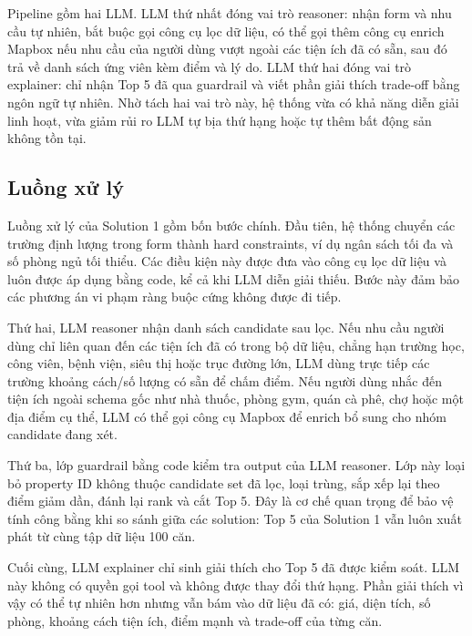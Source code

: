 \documentclass[a4paper,12pt]{article}
\begin{document}
Pipeline gồm hai LLM. LLM thứ nhất đóng vai trò reasoner: nhận form và nhu cầu tự nhiên, bắt buộc gọi công cụ lọc dữ liệu, có thể gọi thêm công cụ enrich Mapbox nếu nhu cầu của người dùng vượt ngoài các tiện ích đã có sẵn, sau đó trả về danh sách ứng viên kèm điểm và lý do. LLM thứ hai đóng vai trò explainer: chỉ nhận Top 5 đã qua guardrail và viết phần giải thích trade-off bằng ngôn ngữ tự nhiên. Nhờ tách hai vai trò này, hệ thống vừa có khả năng diễn giải linh hoạt, vừa giảm rủi ro LLM tự bịa thứ hạng hoặc tự thêm bất động sản không tồn tại.

\subsection{Luồng xử lý}
Luồng xử lý của Solution 1 gồm bốn bước chính. Đầu tiên, hệ thống chuyển các trường định lượng trong form thành hard constraints, ví dụ ngân sách tối đa và số phòng ngủ tối thiểu. Các điều kiện này được đưa vào công cụ lọc dữ liệu và luôn được áp dụng bằng code, kể cả khi LLM diễn giải thiếu. Bước này đảm bảo các phương án vi phạm ràng buộc cứng không được đi tiếp.

Thứ hai, LLM reasoner nhận danh sách candidate sau lọc. Nếu nhu cầu người dùng chỉ liên quan đến các tiện ích đã có trong bộ dữ liệu, chẳng hạn trường học, công viên, bệnh viện, siêu thị hoặc trục đường lớn, LLM dùng trực tiếp các trường khoảng cách/số lượng có sẵn để chấm điểm. Nếu người dùng nhắc đến tiện ích ngoài schema gốc như nhà thuốc, phòng gym, quán cà phê, chợ hoặc một địa điểm cụ thể, LLM có thể gọi công cụ Mapbox để enrich bổ sung cho nhóm candidate đang xét.

Thứ ba, lớp guardrail bằng code kiểm tra output của LLM reasoner. Lớp này loại bỏ property ID không thuộc candidate set đã lọc, loại trùng, sắp xếp lại theo điểm giảm dần, đánh lại rank và cắt Top 5. Đây là cơ chế quan trọng để bảo vệ tính công bằng khi so sánh giữa các solution: Top 5 của Solution 1 vẫn luôn xuất phát từ cùng tập dữ liệu 100 căn.

Cuối cùng, LLM explainer chỉ sinh giải thích cho Top 5 đã được kiểm soát. LLM này không có quyền gọi tool và không được thay đổi thứ hạng. Phần giải thích vì vậy có thể tự nhiên hơn nhưng vẫn bám vào dữ liệu đã có: giá, diện tích, số phòng, khoảng cách tiện ích, điểm mạnh và trade-off của từng căn.
\end{document}
